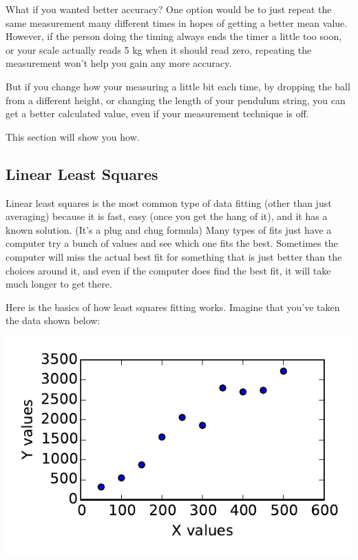 \documentclass[twoside,11pt,ShortChapTitles]{BYUTextbook}
\begin{document}
What if you wanted better accuracy?  One option would be to just repeat the same measurement many different times in hopes of getting a better mean value.  However, if the person doing the timing always ends the timer a little too soon, or your scale actually reads 5 kg when it should read zero, repeating the measurement won't help you gain any more accuracy.

But if you change how your measuring a little bit each time, by dropping the ball from a different height, or changing the length of your pendulum string, you can get a better calculated value, even if your measurement technique is off.  

This section will show you how.

\subsection{Linear Least Squares}

Linear least squares is the most common type of data fitting (other than just averaging) because it is fast, easy (once you get the hang of it), and it has a known solution. (It's a plug and chug formula)
Many types of fits just have a computer try a bunch of values and see which one fits the best.  Sometimes the computer will miss the actual best fit for something that is just better than the choices around it, and even if the computer does find the best fit, it will take much longer to get there.

Here is the basics of how least squares fitting works.  Imagine that you've taken the data shown below:

\begin{center}
\includegraphics{Lab4_figs/dataScatter.pdf}
\end{center}
\end{document}
